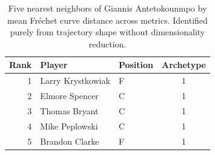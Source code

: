 \begin{table}[htbp]
  \centering\small
  \begin{tabular}{rllc}
    \toprule
    Rank & Player & Position & Archetype \\
    \midrule
    1 & Larry Krystkowiak & F & 1 \\
    2 & Elmore Spencer & C & 1 \\
    3 & Thomas Bryant & C & 1 \\
    4 & Mike Peplowski & C & 1 \\
    5 & Brandon Clarke & F & 1 \\
    \bottomrule
  \end{tabular}
  \caption{Five nearest neighbors of Giannis Antetokounmpo by mean Fr\'{e}chet curve distance across metrics. Identified purely from trajectory shape without dimensionality reduction.}
  \label{tab:Giannis_Antetokounmpo_frechet_curve_neighbors}
\end{table}

